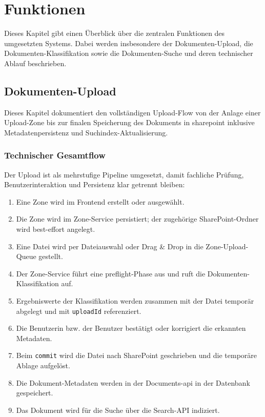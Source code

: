 \section{Funktionen}

Dieses Kapitel gibt einen Überblick über die zentralen Funktionen des umgesetzten Systems. Dabei werden insbesondere der Dokumenten-Upload, die Dokumenten-Klassifikation sowie die Dokumenten-Suche und deren technischer Ablauf beschrieben.

\subsection{Dokumenten-Upload}\label{subsec:dokumenten_upload}

Dieses Kapitel dokumentiert den vollständigen Upload-Flow von der Anlage einer Upload-Zone bis zur finalen Speicherung des Dokuments in \gls{sharepoint} inklusive Metadatenpersistenz und Suchindex-Aktualisierung.

\subsubsection{Technischer Gesamtflow}

Der Upload ist als mehrstufige Pipeline umgesetzt, damit fachliche Prüfung, Benutzerinteraktion und Persistenz klar getrennt bleiben:
\begin{enumerate}
    \item Eine Zone wird im Frontend erstellt oder ausgewählt.
    \item Die Zone wird im Zone-Service persistiert; der zugehörige SharePoint-Ordner wird best-effort angelegt.
    \item Eine Datei wird per Dateiauswahl oder Drag \& Drop in die Zone-Upload-Queue gestellt.
    \item Der Zone-Service führt eine \gls{preflight}-Phase aus und ruft die Dokumenten-Klassifikation auf.
    \item Ergebniswerte der Klassifikation werden zusammen mit der Datei temporär abgelegt und mit \texttt{uploadId} referenziert.
    \item Die Benutzerin bzw. der Benutzer bestätigt oder korrigiert die erkannten Metadaten.
    \item Beim \texttt{commit} wird die Datei nach SharePoint geschrieben und die temporäre Ablage aufgelöst.
    \item Die Dokument-Metadaten werden in der Documents-\acrshort{api} in der Datenbank gespeichert.
    \item Das Dokument wird für die Suche über die Search-API indiziert.
\end{enumerate}

